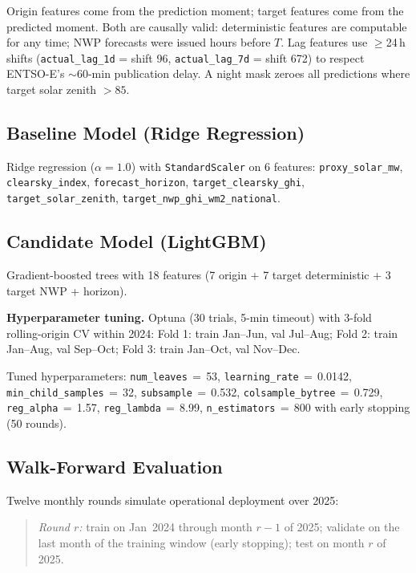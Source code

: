 \documentclass[11pt,a4paper]{article}
\begin{document}
Origin features come from the prediction moment; target features come from the predicted moment.
Both are causally valid: deterministic features are computable for any time; NWP forecasts were issued hours before $T$.
Lag features use $\geq$24\,h shifts (\texttt{actual\_lag\_1d} = shift 96, \texttt{actual\_lag\_7d} = shift 672) to respect ENTSO-E's ${\sim}$60-min publication delay.
A night mask zeroes all predictions where target solar zenith $> 85$\textdegree.

\subsection{Baseline Model (Ridge Regression)}

Ridge regression ($\alpha = 1.0$) with \texttt{StandardScaler} on 6 features:
\texttt{proxy\_solar\_mw}, \texttt{clearsky\_index}, \texttt{forecast\_horizon},
\texttt{target\_clearsky\_ghi}, \texttt{target\_solar\_zenith}, \texttt{target\_nwp\_ghi\_wm2\_national}.

\subsection{Candidate Model (LightGBM)}

Gradient-boosted trees with 18 features (7 origin + 7 target deterministic + 3 target NWP + horizon).

\textbf{Hyperparameter tuning.}
Optuna (30 trials, 5-min timeout) with 3-fold rolling-origin CV within 2024:
Fold 1: train Jan--Jun, val Jul--Aug;
Fold 2: train Jan--Aug, val Sep--Oct;
Fold 3: train Jan--Oct, val Nov--Dec.

Tuned hyperparameters: \texttt{num\_leaves}$\,{=}\,$53, \texttt{learning\_rate}$\,{=}\,$0.0142, \texttt{min\_child\_samples}$\,{=}\,$32, \texttt{subsample}$\,{=}\,$0.532, \texttt{colsample\_bytree}$\,{=}\,$0.729, \texttt{reg\_alpha}$\,{=}\,$1.57, \texttt{reg\_lambda}$\,{=}\,$8.99, \texttt{n\_estimators}$\,{=}\,$800 with early stopping (50 rounds).

\subsection{Walk-Forward Evaluation}

Twelve monthly rounds simulate operational deployment over 2025:

\begin{quote}
\textit{Round $r$:} train on Jan~2024 through month $r{-}1$ of 2025; validate on the last month of the training window (early stopping); test on month $r$ of 2025.
\end{quote}
\end{document}
